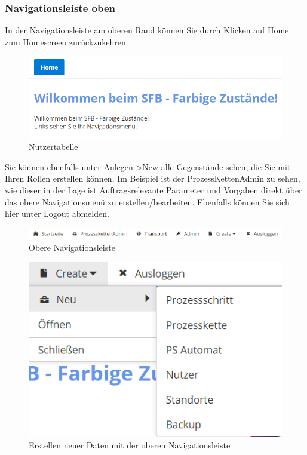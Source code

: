 \documentclass[enabledeprecatedfontcommands,fontsize=12pt,paper=a4,twoside]{scrartcl}
\begin{document}
\subsubsection{Navigationsleiste oben}
In der Navigationsleiste am oberen Rand können Sie durch Klicken auf Home zum Homescreen zurückzukehren.  \\


\begin{figure}[h!]
\begin{center}
 \includegraphics[width=\textwidth]{screenshots/allgemein/willkommeneingeloggt.png}
  \caption{Nutzertabelle}
  \label{fig:boat1}
\end{center}
\end{figure}

Sie können ebenfalls unter Anlegen->New alle Gegenstände sehen, die Sie mit Ihren Rollen erstellen können.
Im Beispiel ist der ProzessKettenAdmin zu sehen, wie dieser in der Lage ist Auftragsrelevante Parameter und Vorgaben direkt über das obere Navigationsmenü zu erstellen/bearbeiten.
Ebenfalls können Sie sich hier unter Logout abmelden. \\


\begin{figure}[h!]
\begin{center}
 \includegraphics[width=\textwidth]{screenshots/allgemein/navigationoben.png}
  \caption{Obere Navigationsleiste}
  \label{fig:boat1}
\end{center}
\end{figure}

\begin{figure}[h!]
\begin{center}
 \includegraphics[scale=0.8]{screenshots/allgemein/navigationcreate.png}
  \caption{Erstellen neuer Daten mit der oberen Navigationsleiste}
  \label{fig:boat1}
\end{center}
\end{figure}
\end{document}
